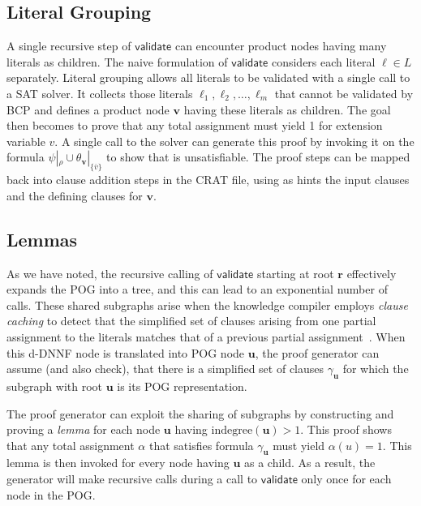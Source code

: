 \documentclass[letterpaper,USenglish,cleveref, autoref, thm-restate]{lipics-v2021}
\newcommand{\obar}[1]{\overline{#1}}
\newcommand{\lit}{\ell}
\newcommand{\assign}{\alpha}
\newcommand{\passign}{\rho}
\newcommand{\indegree}{\textrm{indegree}}
\newcommand{\validate}{\textsf{validate}}
\newcommand{\makenode}[1]{\mathbf{#1}}
\newcommand{\nodeu}{\makenode{u}}
\newcommand{\nodev}{\makenode{v}}
\newcommand{\noder}{\makenode{r}}
\newcommand{\simplify}[2]{#1|_{#2}}
\begin{document}
\label{app:optimizations}

\subsection{Literal Grouping}

A single recursive step of $\validate$ can encounter product nodes
having many literals as children.  The naive formulation of $\validate$
considers each literal $\lit \in L$ separately.
Literal grouping allows all literals to be validated with a single call to a SAT solver.
It collects those literals
$\lit_1, \lit_2, \ldots, \lit_m$ that cannot be validated by BCP and defines a
product node $\nodev$ having these literals as children.  The goal
then becomes to prove that any total assignment must yield 1 for extension
variable $v$.  A single call to the solver can generate this proof by invoking it on the formula
  $\simplify{\psi}{\passign} \cup \simplify{\theta_{\nodev}}{\{ \obar{v} \}}$ to show that is unsatisfiable.
  The proof steps can be mapped back into clause addition steps in the CRAT file, using as hints the
  input clauses and the defining clauses for $\nodev$.


\subsection{Lemmas}
\label{app:lemma}

As we have noted, the recursive calling of $\validate$ starting at
root $\noder$ effectively expands the POG into a tree, and this can
lead to an exponential number of calls.
These shared subgraphs arise when the knowledge compiler employs {\em clause caching}
to detect that the simplified set of
clauses arising from one partial assignment to the literals matches that
of a previous partial assignment~\cite{darwiche:aaai:2002}.
When this d-DNNF node is translated into POG
node $\nodeu$, the proof generator can assume (and also check), that
there is a simplified set of clauses $\gamma_{\nodeu}$
for which the subgraph with root $\nodeu$ is its POG representation.

The proof generator can exploit the sharing of subgraphs
by constructing and proving a {\em lemma} for each node
$\nodeu$ having $\indegree(\nodeu) > 1$.  This proof shows that any
total assignment $\assign$ that satisfies formula $\gamma_{\nodeu}$ must yield
$\assign(u) = 1$.  This lemma is then invoked for every node having
$\nodeu$ as a child.  As a result, the generator will make recursive calls during a call to $\validate$ only once for each node in the POG\@.
\end{document}
